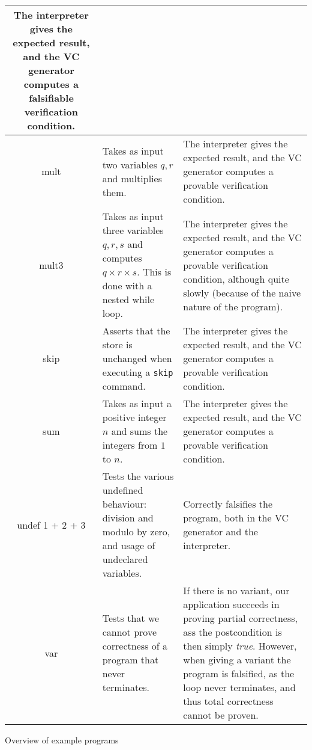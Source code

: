 \begin{longtable}{|c|p{4.4cm}|p{4.4cm}|}
   The interpreter gives the expected result, and the VC generator computes a falsifiable verification condition. \\
 	\hline
 	mult &
   Takes as input two variables $q,r$ and multiplies them. & 
   The interpreter gives the expected result, and the VC generator computes a provable verification condition. \\
 	\hline
 	mult3 &
   Takes as input three variables $q,r,s$ and computes $q \times r \times s$. This is done with a nested while loop. & 
   The interpreter gives the expected result, and the VC generator computes a provable verification condition, although quite slowly (because of the naive nature of the program). \\
 	\hline
 	skip &
   Asserts that the store is unchanged when executing a \texttt{skip} command. & 
   The interpreter gives the expected result, and the VC generator computes a provable verification condition. \\
 	\hline
 	sum & 
   Takes as input a positive integer $n$ and sums the integers from $1$ to $n$. & 
   The interpreter gives the expected result, and the VC generator computes a provable verification condition. \\
 	\hline
 	undef 1 + 2 + 3 & 
   Tests the various undefined behaviour: division and modulo by zero, and usage of undeclared variables. &
   Correctly falsifies the program, both in the VC generator and the interpreter. \\
 	\hline
 	var & 
   Tests that we cannot prove correctness of a program that never terminates. &
	 If there is no variant, our application succeeds in proving partial correctness, ass the postcondition is then simply \textit{true}. However, when giving a variant the program is falsified, as the loop never terminates, and thus total correctness cannot be proven. \\
 	\hline
\end{longtable}
\caption{Overview of example programs}
\label{table:testprograms}
